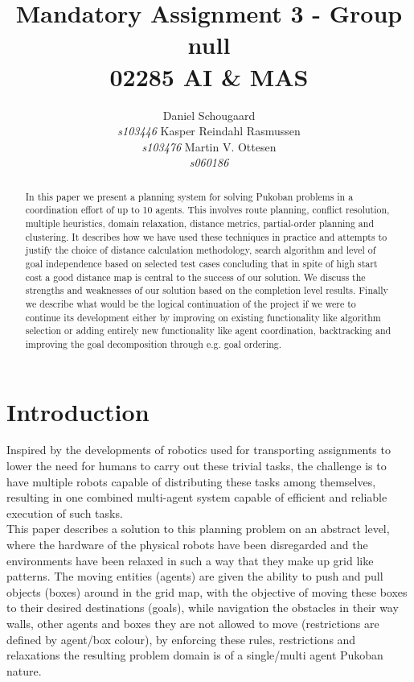 \documentclass[letterpaper]{article}
\begin{document}
\title{Mandatory Assignment 3 - Group null\\ 02285 AI \& MAS}
\author{Daniel Schougaard \\ \textit{s103446} \And Kasper Reindahl Rasmussen\\ \textit{s103476} \And Martin V. Ottesen\\ \textit{s060186}}
\maketitle

\begin{abstract}
In this paper we present a planning system for solving Pukoban problems in a coordination effort of up to 10 agents. This involves route planning, conflict resolution, multiple heuristics, domain relaxation, distance metrics, partial-order planning and clustering.  It describes how we have used these techniques in practice and attempts to justify the choice of distance calculation methodology, search algorithm and level of goal independence based on selected test cases concluding that in spite of high start cost a good distance map is central to the success of our solution.  We discuss the strengths and weaknesses of our solution based on the completion level results. Finally we describe what would be the logical continuation of the project if we were to continue its development either by improving on existing functionality like algorithm selection or adding entirely new functionality like agent coordination, backtracking and improving the goal decomposition through e.g. goal ordering.
\end{abstract}

\section{Introduction}
	Inspired by the developments of robotics used for transporting assignments to lower the need for humans to carry out these trivial tasks, the challenge is to have multiple robots capable of distributing these tasks among themselves, resulting in one combined multi-agent system capable of efficient and reliable execution of such tasks.\\
	This paper describes a solution to this planning problem on an abstract level, where the hardware of the physical robots have been disregarded and the environments have been relaxed in such a way that they make up grid like patterns. The moving entities (agents) are given the ability to push and pull objects (boxes) around in the grid map, with the objective of moving these boxes to their desired destinations (goals), while navigation the obstacles in their way walls, other agents and boxes they are not allowed to move (restrictions are defined by agent/box colour), by enforcing these rules, restrictions and relaxations the resulting problem domain is of a single/multi agent Pukoban nature. 
	
\end{document}

